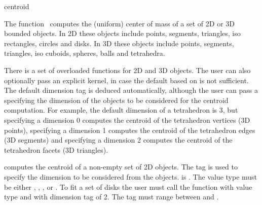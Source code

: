 
\begin{ccRefFunction}{centroid}  

\ccDefinition
  
The function \ccRefName\ computes the (uniform) center of mass of a set of 2D or 3D bounded objects. In 2D these objects include points, segments, triangles, iso rectangles, circles and disks. In 3D these objects include points, segments, triangles, iso cuboids, spheres, balls and tetrahedra.


There is a set of overloaded  functions for 2D and 3D objects. The user can also optionally pass an explicit kernel, in case the default based on  is not sufficient. The default dimension tag is deduced automatically, although the user can pass a  specifying the dimension of the objects to be considered for the centroid computation. For example, the default dimension of a tetrahedron is 3, but specifying a dimension 0 computes the centroid of the tetrahedron vertices (3D points), specifying a dimension 1 computes the centroid of the tetrahedron edges (3D segments) and specifying a dimension 2 computes the centroid of the tetrahedron facets (3D triangles).

{ computes the centroid of a non-empty set of 2D objects. The tag is used to specify the dimension to be considered from the objects.  is .
The value type must be either , , ,  or . To fit a set of disks the user must call the function with value type  and with dimension tag of 2. The tag must range between  and .
 }


\end{ccRefFunction}

